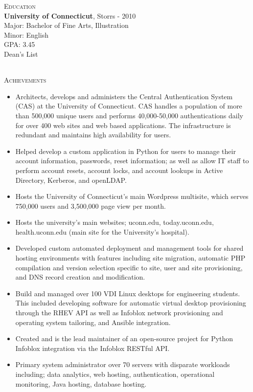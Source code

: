 \documentclass[11pt,letterpaper]{letter}
\newcommand\tab[1][1cm]{\hspace*{#1}}
\newcommand*{\SectionTitle}[1]{
    \vspace{3mm}
    \textcolor{bluebook}{\textsc{\LARGE{{#1}}}}}
\begin{document}
\SectionTitle{Education}
\vspace{3mm}\\
\tab \textbf{University of Connecticut}, Storrs - 2010 \\
\tab Major: Bachelor of Fine Arts, Illustration \\
\tab Minor: English \\
\tab GPA: 3.45 \\
\tab Dean's List

\vspace{20mm} \\

\SectionTitle{Achievements}
\begin{itemize}
  \item Architects, develops and administers the Central Authentication System (CAS) at the University of Connecticut. CAS handles a population of more than 500,000 unique users and performs 40,000-50,000 authentications daily for over 400 web sites and web based applications. The infrastructure is redundant and maintains high availability for users.
  \item Helped develop a custom application in Python for users to manage their account information, passwords, reset information; as well as allow IT staff to perform account resets, account locks, and account lookups in Active Directory, Kerberos, and openLDAP.
  \item Hosts the University of Connecticut’s main Wordpress multisite, which serves 750,000 users and 3,500,000 page view per month. 
  \item Hosts the university’s main websites; uconn.edu, today.uconn.edu, health.uconn.edu (main site for the University’s hospital).
  \item Developed custom automated deployment and management tools for shared hosting environments with features including site migration, automatic PHP compilation and version selection specific to site, user and site provisioning, and DNS record creation and modification.
  \item Build and managed over 100 VDI Linux desktops for engineering students. This included developing software for automatic virtual desktop provisioning through the RHEV API as well as Infoblox network provisioning and operating system tailoring, and Ansible integration.
  \item Created and is the lead maintainer of an open-source project for Python Infoblox integration via the Infoblox RESTful API.
  \item Primary system administrator over 70 servers with disparate workloads including; data analytics, web hosting, authentication, operational monitoring, Java hosting, database hosting.
\end{itemize}
\end{document}
